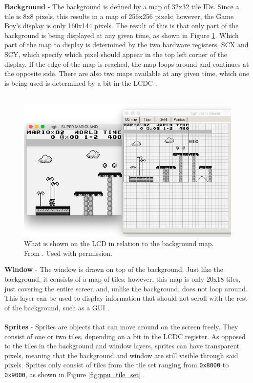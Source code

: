 \textbf{Background} - 
The background is defined by a map of 32x32 tile IDs. Since a tile is 8x8 pixels, this results in a map of 256x256 pixels; however, the Game Boy's display is only 160x144 pixels. The result of this is that only part of the background is being displayed at any given time, as shown in Figure \ref{fig:ppu_viewport}. Which part of the map to display is determined by the two hardware registers, SCX and SCY, which specify which pixel should appear in the top left corner of the display. If the edge of the map is reached, the map loops around and continues at the opposite side. There are also two maps available at any given time, which one is being used is determined by a bit in the LCDC \cite{pandocsVideo}.\\
\\
\begin{figure}[H]
    \centering
    \includegraphics[width=\linewidth]{figures/PPU/PPU_viewport.png}
    \caption{What is shown on the LCD in relation to the background map. From \cite{ultimateGBtalkSlides}. Used with permission.}
    \label{fig:ppu_viewport}
\end{figure}
\textbf{Window} - 
The window is drawn on top of the background. Just like the background, it consists of a map of tiles; however, this map is only 20x18 tiles, just covering the entire screen and, unlike the background, does not loop around. This layer can be used to display information that should not scroll with the rest of the background, such as a GUI \cite{pandocsVideo}.\\
\\
\textbf{Sprites} - 
Sprites are objects that can move around on the screen freely. They consist of one or two tiles, depending on a bit in the LCDC register. As opposed to the tiles in the background and window layers, sprites can have transparent pixels, meaning that the background and window are still visible through said pixels. Sprites only consist of tiles from the tile set ranging from \texttt{0x8000} to \texttt{0x9000}, as shown in Figure \ref{fig:ppu_tile_set} \cite{pandocsVideo}.\\
